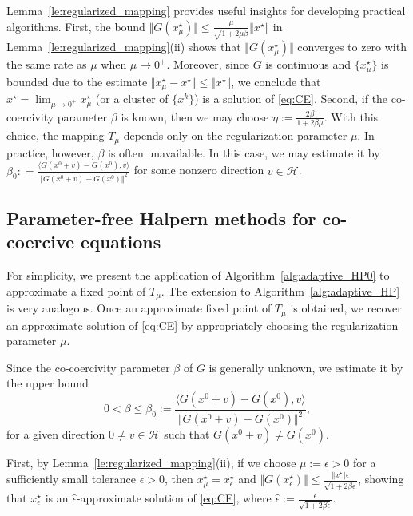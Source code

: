 \documentclass{article}
\theoremstyle{plain}
\theoremstyle{definition}
\newcommand{\Hil}{\mathcal{H}}
\newcommand{\sets}[1]{\{#1\}}
\newcommand{\norms}[1]{\Vert#1\Vert}
\newcommand{\iprods}[1]{\langle #1\rangle}
\newcommand{\0}{\boldsymbol{0}}
\begin{document}
Lemma~\ref{le:regularized_mapping} provides useful insights for developing practical algorithms.
First, the bound $\norms{G(x_{\mu}^{\star})} \leq \frac{\mu}{\sqrt{1+2\mu\beta}}\norms{x^{\star}}$ in Lemma~\ref{le:regularized_mapping}(ii) shows that $\norms{G(x^{\star}_{\mu})}$ converges to zero with the same rate as $\mu$ when $\mu \to 0^{+}$.
Moreover, since $G$ is continuous and $\sets{x^{\star}_{\mu}}$ is bounded due to the estimate $\norms{x^{\star}_{\mu} - x^{\star}} \leq \norms{x^{\star}}$, we conclude that $x^{\star} = \lim_{\mu\to 0^{+}}x^{\star}_{\mu}$ (or a cluster of $\sets{x^k}$) is a solution of \eqref{eq:CE}.
Second, if the co-coercivity parameter $\beta$ is known, then we may choose $\eta := \frac{2\beta}{1 + 2\beta\mu}$.
With this choice, the mapping $T_{\mu}$ depends only on the regularization parameter $\mu$.
In practice, however, $\beta$ is often unavailable. In this case, we may estimate it by $\beta_0 : = \frac{\iprods{G(x^0 + v) - G(x^0), v}}{\norms{G(x^0 + v) - G(x^0)}^2}$ for some nonzero direction $v \in\Hil$.

\subsection{Parameter-free Halpern methods for co-coercive equations}\label{subsec:methods_for_CE}
For simplicity, we present the application of Algorithm~\ref{alg:adaptive_HP0} to approximate a fixed point of $T_{\mu}$. 
The extension to Algorithm~\ref{alg:adaptive_HP} is very analogous. 
Once an approximate fixed point of $T_{\mu}$ is obtained, we recover an approximate solution of \eqref{eq:CE} by appropriately choosing the regularization parameter $\mu$.

Since the co-coercivity parameter $\beta$ of $G$ is generally unknown, we estimate it by the upper bound
\begin{equation}\label{eq:beta_0_estimate}
0 < \beta \leq \beta_0 := \frac{\iprods{G(x^0 + v) - G(x^0), v}}{\norms{G(x^0 + v) - G(x^0)}^2},
\end{equation}
for a given direction $0 \neq v\in\Hil$ such that $G(x^0 + v) \neq G(x^0)$.

First, by Lemma~\ref{le:regularized_mapping}(ii), if we choose $\mu := \epsilon > 0$ for a sufficiently small tolerance $\epsilon > 0$, then $x^{\star}_{\mu} = x^{\star}_{\epsilon}$ and $\norms{G(x^{\star}_{\epsilon})} \leq \frac{\norms{x^{\star}}\epsilon}{\sqrt{1 + 2\beta\epsilon}}$, showing that $x^{\star}_{\epsilon}$ is an $\hat{\epsilon}$-approximate solution of \eqref{eq:CE}, where $\hat{\epsilon} := \frac{\epsilon}{\sqrt{1 + 2\beta\epsilon}}$.
\end{document}
